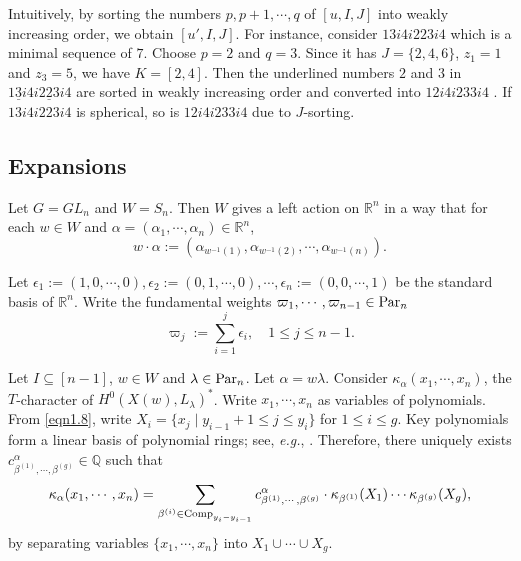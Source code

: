 \documentclass[12pt]{amsart}
\theoremstyle{definition}
\theoremstyle{remark}
\newcommand{\R}{\mathbb{R}}
\newcommand{\Q}{\mathbb{Q}}
\newcommand{\Parn}{{\rm Par}_n}
\begin{document}
Intuitively, by sorting the numbers $p , p+1 , \cdots , q$ of $[u,I,J]$ into weakly increasing order, we obtain $[u' ,I,J]$. For instance, consider $13i4i223i4$ which is a minimal sequence of $7$. Choose $p=2$ and $q = 3$. Since it has $J = \{ 2,4,6 \}$, $z_1 = 1$ and $z_3 = 5$, we have $K = [2,4]$. Then the underlined numbers $2$ and $3$ in $1 \underline{3} i 4 i \underline{223} i 4$ are sorted in weakly increasing order and converted into $12i4i233i4$
. If $13i4i223i4$ is spherical, so is $12i4i233i4$ due to $J$-sorting.



\subsection{Expansions}

Let $G = GL_n$ and $W=S_n$. Then $W$ gives a left action on $\R^n$ in a way that for each $w \in W$ and $\alpha = (\alpha_1 , \cdots , \alpha_n) \in \R^n$,
\begin{equation}
w \cdot \alpha := (\alpha_{w^{-1}(1)}, \alpha_{w^{-1}(2)} , \cdots , \alpha_{w^{-1}(n)}).
\end{equation}

Let $\epsilon_1 := (1 , 0 , \cdots , 0), \epsilon_2 := (0 , 1 , \cdots , 0) , \cdots , \epsilon_n := (0 , 0 , \cdots , 1)$ be the standard basis of $\R^n$. Write the fundamental weights $\varpi_1 , \cdots , \varpi_{n-1} \in \Parn$
\begin{equation}
\varpi_{j} := \sum_{i=1}^j \epsilon_i, \quad 1 \leq j \leq n-1.
\end{equation}

Let $I \subseteq [n-1]$, $w \in W$ and $\lambda \in \Parn$. Let $\alpha = w\lambda$. Consider $\kappa_{\alpha} (x_1 , \cdots , x_n)$, the $T$-character of $H^0 (X(w), L_\lambda)^*$. Write $x_1 , \cdots , x_n$ as variables of polynomials. From \eqref{eqn1.8}, write $X_i = \{ x_j \mid y_{i-1}+1 \leq j \leq y_i \}$ for $1 \leq i \leq g$. Key polynomials form a linear basis of polynomial rings; see, 
\textit{e.g.}, \cite[\S 1]{MR4599567}. Therefore, there uniquely exists $c_{\beta^{(1)} , \cdots , \beta^{(g)}}^\alpha \in \Q$ such that
\begin{equation}
\kappa_\alpha (x_1 , \cdots , x_n) = \sum_{\beta^{(i)} \in {\rm Comp}_{y_i - y_{i-1}}} c_{\beta^{(1)} , \cdots , \beta^{(g)}}^\alpha \cdot \kappa_{\beta^{(1)}}(X_1) \cdots \kappa_{\beta^{(g)}}(X_g),
\end{equation}
by separating variables $\{ x_1 , \cdots , x_n \}$ into $X_1 \cup \cdots \cup X_g$.
\end{document}
